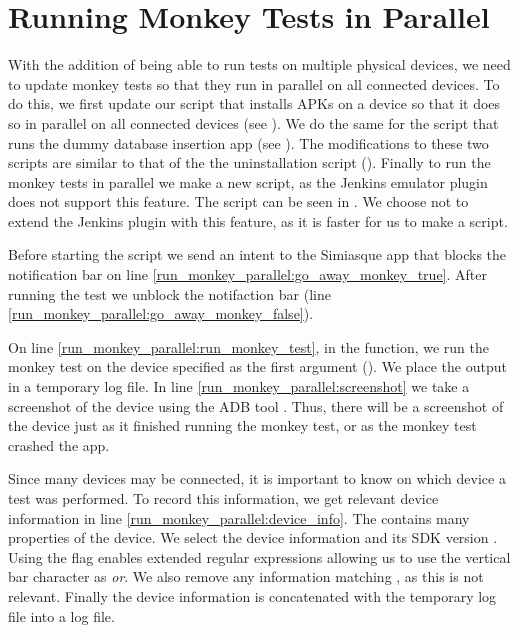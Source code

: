 \section{Running Monkey Tests in Parallel}\label{sec:monkey_in_parallel}
With the addition of being able to run tests on multiple physical devices, we need to update monkey tests so that they run in parallel on all connected devices. To do this, we first update our script that installs APKs on a device so that it does so in parallel on all connected devices (see ). We do the same for the script that runs the dummy database insertion app (see ). The modifications to these two scripts are similar to that of the the uninstallation script (). Finally to run the monkey tests in parallel we make a new script, as the Jenkins emulator plugin does not support this feature. The script can be seen in . We choose not to extend the Jenkins plugin with this feature, as it is faster for us to make a script.

Before starting the script we send an intent to the Simiasque app that blocks the notification bar on line \ref{run_monkey_parallel:go_away_monkey_true}. After running the test we unblock the notifaction bar (line \ref{run_monkey_parallel:go_away_monkey_false}).

On line \ref{run_monkey_parallel:run_monkey_test}, in the  function, we run the monkey test on the device specified as the first argument (). We place the output in a temporary log file. In line \ref{run_monkey_parallel:screenshot} we take a screenshot of the device using the ADB tool \parencite{stackoverflow-adb-screencap2014}. Thus, there will be a screenshot of the device just as it finished running the monkey test, or as the monkey test crashed the app.

Since many devices may be connected, it is important to know on which device a test was performed. To record this information, we get relevant device information in line \ref{run_monkey_parallel:device_info}. The  contains many properties of the device. We select the device information and its SDK version . Using the  flag enables extended regular expressions allowing us to use the vertical bar character as \emph{or}. We also remove any information matching , as this is not relevant. Finally the device information is concatenated with the temporary log file into a log file.

